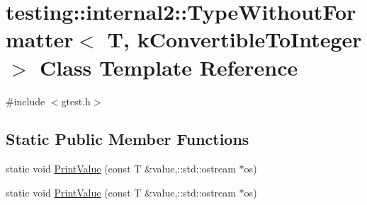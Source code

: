 \hypertarget{classtesting_1_1internal2_1_1_type_without_formatter_3_01_t_00_01k_convertible_to_integer_01_4}{\section{testing\-:\-:internal2\-:\-:Type\-Without\-Formatter$<$ T, k\-Convertible\-To\-Integer $>$ Class Template Reference}
\label{classtesting_1_1internal2_1_1_type_without_formatter_3_01_t_00_01k_convertible_to_integer_01_4}
}


{\ttfamily \#include $<$gtest.\-h$>$}

\subsection*{Static Public Member Functions}
\begin{DoxyCompactItemize}
\item 
static void \hyperlink{classtesting_1_1internal2_1_1_type_without_formatter_3_01_t_00_01k_convertible_to_integer_01_4_a6b293e13b58e50bba0e220c25e0614b7}{Print\-Value} (const T \&value,\-::std\-::ostream $\ast$os)
\item 
static void \hyperlink{classtesting_1_1internal2_1_1_type_without_formatter_3_01_t_00_01k_convertible_to_integer_01_4_a6b293e13b58e50bba0e220c25e0614b7}{Print\-Value} (const T \&value,\-::std\-::ostream $\ast$os)
\end{DoxyCompactItemize}


